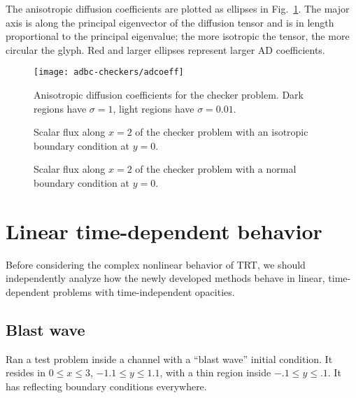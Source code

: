 The anisotropic diffusion coefficients are plotted as ellipses in
Fig.~\ref{fig:bcCheckersAdcoeff}. The major axis is along the principal
eigenvector of the diffusion tensor and is in length proportional to the
principal eigenvalue; the more isotropic the tensor, the more circular the
glyph. Red and larger ellipses represent larger AD coefficients.

\begin{figure}[htb]
  \centering\small
  \texttt{[image: adbc-checkers/adcoeff]}
  \caption[Anisotropic diffusion coefficients for the checker problem.]{
  Anisotropic diffusion coefficients for the checker problem. Dark
  regions have $\sigma=1$, light regions have $\sigma=0.01$.}
  \label{fig:bcCheckersAdcoeff}
\end{figure}

\begin{figure}[htb]
  \centering\small
  \hspace{-.5in}
  
  \hspace{-.5in}
  \caption{Scalar flux along $x=2$ of the checker problem with an isotropic
  boundary condition at $y=0$.}
  \label{fig:bcCheckersIsotropic}
\end{figure}

\begin{figure}[htb]
  \centering\small
  \hspace{-.5in}
  
  \hspace{-.5in}
  \caption{Scalar flux along $x=2$ of the checker problem with a normal
  boundary condition at $y=0$.}
  \label{fig:bcCheckersDelta}
\end{figure}

\section{Linear time-dependent behavior}

Before considering the complex nonlinear behavior of TRT, we should
independently analyze how the newly developed methods behave in linear,
time-dependent problems with time-independent opacities.

\subsection{Blast wave}

Ran a test problem inside a channel with a ``blast wave'' initial condition. It
resides in $0 \le x \le 3$, $-1.1 \le y \le 1.1$, with a thin region inside
$-.1 \le y \le .1$. It has reflecting boundary conditions everywhere.

